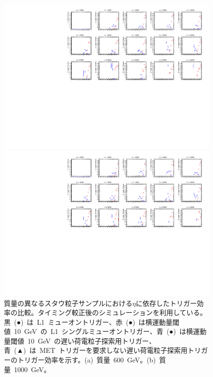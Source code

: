 \begin{figure}[H]
    \begin{minipage}{0.49\hsize}
    \centering   
    \includegraphics[width=\textwidth,page=9]{img/rec/stau_600.pdf}
    \subcaption{}
    \end{minipage}
    \begin{minipage}{0.49\hsize}
    \centering   
    \includegraphics[width=\textwidth,page=9]{img/rec/stau_1000.pdf}
    \subcaption{}
    \end{minipage}
    \caption[質量の異なるスタウ粒子サンプルにおける$\eta$に依存したトリガー効率の比較]{質量の異なるスタウ粒子サンプルにおける$\eta$に依存したトリガー効率の比較。タイミング較正後のシミュレーションを利用している。黒~(●)~は~L1~ミューオントリガー、赤~(●)~は横運動量閾値~10~GeV~の~L1~シングルミューオントリガー、青~(●)~は横運動量閾値~10~GeV~の遅い荷電粒子探索用トリガー、青~(▲)~は~MET~トリガーを要求しない遅い荷電粒子探索用トリガーのトリガー効率を示す。(a)~質量~600~GeV。(b)~質量~1000~GeV。}\label{fig:trieta6}
\end{figure}
